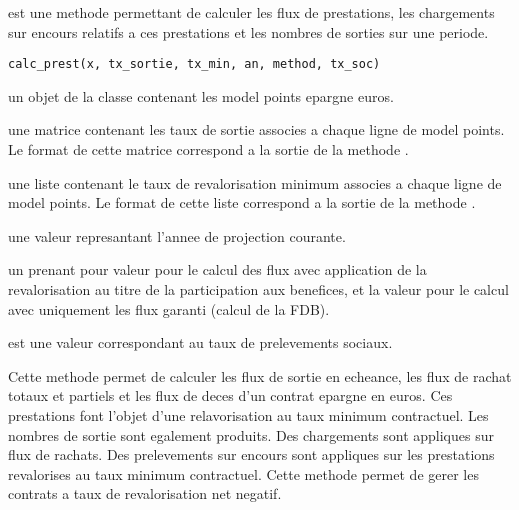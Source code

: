 \documentclass[a4paper]{book}
\begin{document}
%
\begin{Description}\relax
{} est une methode permettant de calculer les flux de prestations,
les chargements sur encours relatifs a ces prestations et les nombres de sorties sur une periode.
\end{Description}
%
\begin{Usage}
\begin{verbatim}
calc_prest(x, tx_sortie, tx_min, an, method, tx_soc)
\end{verbatim}
\end{Usage}
%
\begin{Arguments}
\begin{ldescription}
\item[\code{x}] un objet de la classe  contenant les model points epargne euros.

\item[\code{tx\_sortie}] une matrice contenant les taux de sortie associes a chaque ligne de model points.
Le format de cette matrice correspond a la sortie de la methode .

\item[\code{tx\_min}] une liste contenant le taux de revalorisation minimum associes a chaque ligne de model points.
Le format de cette liste correspond a la sortie de la methode .

\item[\code{an}] une valeur  represantant l'annee de projection courante.

\item[\code{method}] un  prenant pour valeur  pour le calcul
des flux avec application de la revalorisation au titre de la participation aux benefices,
et la valeur  pour le calcul avec uniquement les flux garanti (calcul de la FDB).

\item[\code{tx\_soc}] est une valeur  correspondant au taux de prelevements sociaux.
\end{ldescription}
\end{Arguments}
%
\begin{Details}\relax
Cette methode permet de calculer les flux de sortie en echeance, les flux de rachat totaux et partiels et
les flux de deces d'un contrat epargne en euros. Ces prestations font l'objet d'une relavorisation
au taux minimum contractuel. Les nombres de sortie sont egalement produits.
Des chargements sont appliques sur flux de rachats. Des prelevements sur encours sont appliques sur les
prestations revalorises au taux minimum contractuel. Cette methode permet de gerer les contrats a taux de
revalorisation net negatif.
\end{Details}
\end{document}
